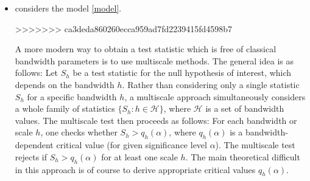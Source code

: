 \documentclass[a4paper,12pt]{article}
\begin{document}
\begin{itemize}[label=--,leftmargin=0.5cm]
\item \cite*{Zhang2012} considers the model \eqref{model}.


>>>>>>> ca3deda860260ecca959ad7fd2239415fd4598b7


A more modern way to obtain a test statistic which is free of classical bandwidth parameters is to use multiscale methods. The general idea is as follows: Let $S_h$ be a test statistic for the null hypothesis of interest, which depends on the bandwidth $h$. Rather than considering only a single statistic $S_h$ for a specific bandwidth $h$, a multiscale approach simultaneously considers a whole family of statistics $\{S_h: h \in \mathcal{H} \}$, where $\mathcal{H}$ is a set of bandwidth values. The multiscale test then proceeds as follows: For each bandwidth or scale $h$, one checks whether $S_h > q_h(\alpha)$, where $q_h(\alpha)$ is a bandwidth-dependent critical value (for given significance level $\alpha$). The multiscale test rejects if $S_h > q_h(\alpha)$ for at least one scale $h$. The main theoretical difficult in this approach is of course to derive appropriate critical values $q_h(\alpha)$. 



\end{itemize}
\end{document}
